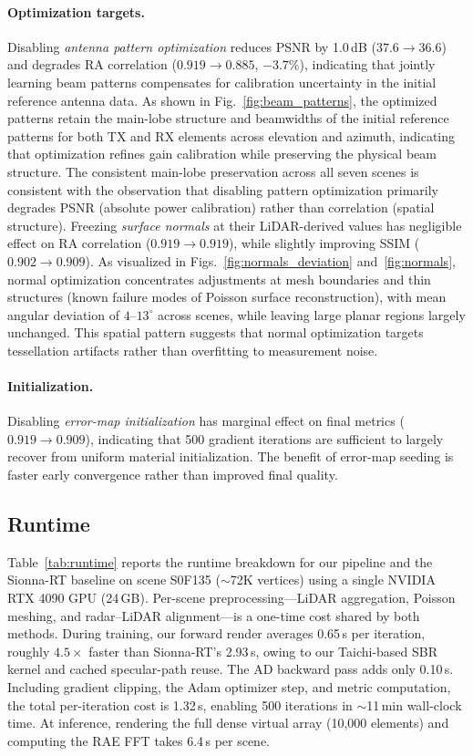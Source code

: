 \paragraph{Optimization targets.}
Disabling \emph{antenna pattern optimization} reduces PSNR by
1.0\,dB ($37.6 \to 36.6$) and degrades RA correlation
($0.919 \to 0.885$, $-3.7\%$), indicating that jointly learning beam patterns
compensates for calibration uncertainty in the initial reference antenna
data. As shown in Fig.~\ref{fig:beam_patterns}, the optimized patterns
retain the main-lobe structure and beamwidths of the initial reference
patterns for both TX and RX elements across elevation and azimuth,
indicating that optimization refines gain calibration while preserving
the physical beam structure. The consistent main-lobe preservation
across all seven scenes is consistent with the observation that
disabling pattern optimization primarily degrades PSNR (absolute power
calibration) rather than correlation (spatial structure).
%
Freezing \emph{surface normals} at their LiDAR-derived values has
negligible effect on RA correlation ($0.919 \to 0.919$), while slightly
improving SSIM ($0.902 \to 0.909$). As visualized in
Figs.~\ref{fig:normals_deviation} and~\ref{fig:normals}, normal
optimization concentrates adjustments at mesh boundaries and thin
structures (known failure modes of Poisson surface
reconstruction), with mean angular deviation of $4$--$13^{\circ}$
across scenes, while leaving large planar regions largely unchanged.
This spatial pattern suggests that normal optimization targets
tessellation artifacts rather than overfitting to measurement noise.

\paragraph{Initialization.}
Disabling \emph{error-map initialization} has marginal effect on
final metrics ($0.919 \to 0.909$), indicating that 500 gradient
iterations are sufficient to largely recover from uniform material
initialization. The benefit of error-map seeding is faster early
convergence rather than improved final quality.

\FloatBarrier
\subsection{Runtime}
\label{sec:runtime}

Table~\ref{tab:runtime} reports the runtime breakdown for our pipeline and the Sionna-RT baseline on scene S0F135 ($\sim$72K vertices) using a single NVIDIA RTX 4090 GPU (24\,GB).
Per-scene preprocessing---LiDAR aggregation, Poisson meshing, and radar--LiDAR alignment---is a one-time cost shared by both methods.
During training, our forward render averages 0.65\,s per iteration, roughly $4.5\times$ faster than Sionna-RT's 2.93\,s, owing to our Taichi-based SBR kernel and cached specular-path reuse.
The AD backward pass adds only 0.10\,s.
Including gradient clipping, the Adam optimizer step, and metric computation, the total per-iteration cost is 1.32\,s, enabling 500 iterations in $\sim$11\,min wall-clock time.
At inference, rendering the full dense virtual array (10,000 elements) and computing the RAE FFT takes 6.4\,s per scene.

